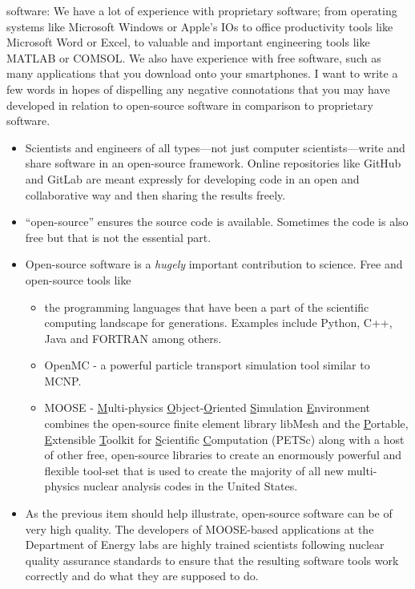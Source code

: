 software:
We have a lot of experience with proprietary software; from operating systems like Microsoft Windows or Apple's IOs to office productivity tools like Microsoft Word or Excel, to valuable and important engineering tools like MATLAB or COMSOL.  We also have experience with free software, such as many applications that you download onto your smartphones.  I want to write a few words in hopes of dispelling any negative connotations that you may have developed in relation to open-source software in comparison to proprietary software.
\begin{itemize}
\item Scientists and engineers of all types---not just computer scientists---write and share software in an open-source framework.  Online repositories like GitHub and GitLab are meant expressly for developing code in an open and collaborative way and then sharing the results freely.
\item ``open-source'' ensures the source code is available.  Sometimes the code is also free but that is not the essential part.

\item Open-source software is a \emph{hugely} important contribution to science.  Free and open-source tools like
\begin{itemize}
\item the programming languages that have been a part of the scientific computing landscape for generations.  Examples include Python, C++, Java and FORTRAN among others.
\item OpenMC\cite{ROMANO201590} - a powerful particle transport simulation tool similar to MCNP.
\item MOOSE - \underline{M}ulti-physics \underline{O}bject-\underline{O}riented \underline{S}imulation \underline{E}nvironment\cite{lindsay2022moose} combines the open-source finite element library libMesh\cite{kirk2006libmesh} and the \underline{P}ortable, \underline{E}xtensible \underline{T}oolkit for \underline{S}cientific \underline{C}omputation (PETSc)\cite{petsc-user-ref} along with a host of other free, open-source libraries to create an enormously powerful and flexible tool-set that is used to create the majority of all new multi-physics nuclear analysis codes in the United States.
\end{itemize} 
\item As the previous item should help illustrate, open-source software can be of very high quality.  The developers of MOOSE-based applications at the Department of Energy labs are highly trained scientists following nuclear quality assurance standards to ensure that the resulting software tools work correctly and do what they are supposed to do. 
\end{itemize}
